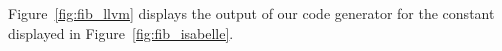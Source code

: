 \documentclass[a4paper,USenglish,cleveref, autoref]{lipics-v2019}
\begin{document}
% 
%   
%   
% 
% 

\begin{example}
Figure~\ref{fig:fib_llvm} displays the output of our code generator for the  constant displayed in Figure~\ref{fig:fib_isabelle}.
\end{example}
\end{document}
